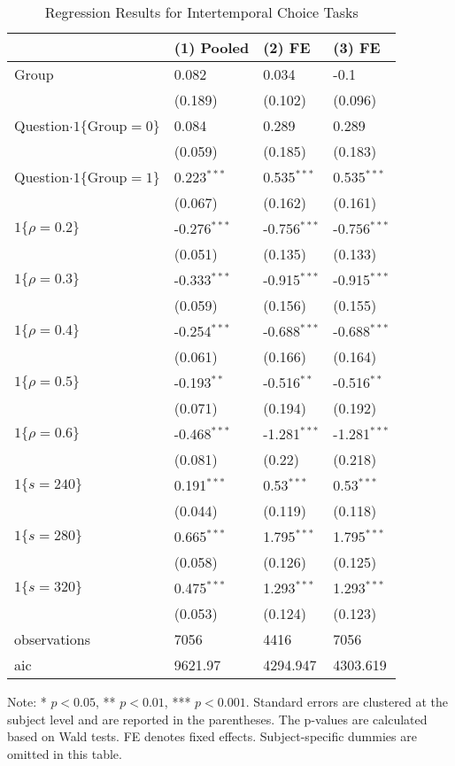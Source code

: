 \documentclass[12pt]{article}
\begin{document}
\begin{table}
    \caption{Regression Results for Intertemporal Choice Tasks}
    \vspace*{12pt}
    \centering

      \begin{tabular}{llll}
\hline
 & (1) Pooled & (2) FE & (3) FE \\
\hline
Group & 0.082 & 0.034 & -0.1 \\
 & (0.189) & (0.102) & (0.096) \\
Question$\cdot1\{\text{Group}=0\}$ & 0.084 & 0.289 & 0.289 \\
 & (0.059) & (0.185) & (0.183) \\
Question$\cdot1\{\text{Group}=1\}$ & 0.223$^{***}$ & 0.535$^{***}$ & 0.535$^{***}$ \\
 & (0.067) & (0.162) & (0.161) \\
$1\{\rho=0.2\}$ & -0.276$^{***}$ & -0.756$^{***}$ & -0.756$^{***}$ \\
 & (0.051) & (0.135) & (0.133) \\
$1\{\rho=0.3\}$ & -0.333$^{***}$ & -0.915$^{***}$ & -0.915$^{***}$ \\
 & (0.059) & (0.156) & (0.155) \\
$1\{\rho=0.4\}$ & -0.254$^{***}$ & -0.688$^{***}$ & -0.688$^{***}$ \\
 & (0.061) & (0.166) & (0.164) \\
$1\{\rho=0.5\}$ & -0.193$^{**}$ & -0.516$^{**}$ & -0.516$^{**}$ \\
 & (0.071) & (0.194) & (0.192) \\
$1\{\rho=0.6\}$ & -0.468$^{***}$ & -1.281$^{***}$ & -1.281$^{***}$ \\
 & (0.081) & (0.22) & (0.218) \\
$1\{s=240\}$ & 0.191$^{***}$ & 0.53$^{***}$ & 0.53$^{***}$ \\
 & (0.044) & (0.119) & (0.118) \\
$1\{s=280\}$ & 0.665$^{***}$ & 1.795$^{***}$ & 1.795$^{***}$ \\
 & (0.058) & (0.126) & (0.125) \\
$1\{s=320\}$ & 0.475$^{***}$ & 1.293$^{***}$ & 1.293$^{***}$ \\
 & (0.053) & (0.124) & (0.123) \\\hline

observations & 7056 & 4416 & 7056 \\
aic & 9621.97 & 4294.947 & 4303.619 \\
\hline
\end{tabular}

    \vspace*{4pt}
    \centering
    \begin{minipage}{0.85\textwidth}
    {\par\footnotesize Note: * $p<0.05$, ** $p<0.01$, *** $p<0.001$. Standard errors are clustered at the subject level and are reported in the parentheses. The p-values are calculated based on Wald tests. FE denotes fixed effects. Subject-specific dummies are omitted in this table.}
    \end{minipage}
    \label{tab:manipulate_intertemporal_choice}
\end{table}
\end{document}
